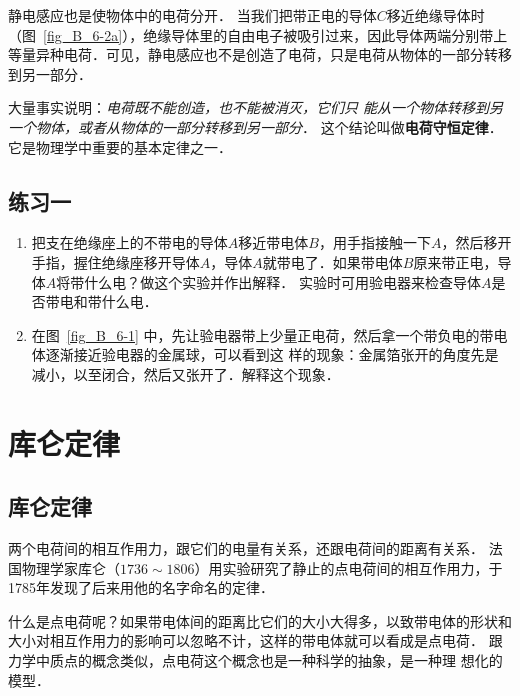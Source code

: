 静电感应也是使物体中的电荷分开．
当我们把带正电的导体$C$移近绝缘导体时（图~\ref{fig_B_6-2a}），绝缘导体里的自由电子被吸引过来，因此导体两端分别带上等量异种电荷．可见，静电感应也不是创造了电荷，只是电荷从物体的一部分转移到另一部分．


大量事实说明：\textit{电荷既不能创造，也不能被消灭，它们只
能从一个物体转移到另一个物体，或者从物体的一部分转移到另一部分}．
这个结论叫做\textbf{电荷守恒定律}．它是物理学中重要的基本定律之一．

\subsection*{练习一}
\begin{enumerate}
\item 把支在绝缘座上的不带电的导体$A$移近带电体$B$，用手指接触一下$A$，然后移开手指，握住绝缘座移开导体$A$，导体$A$就带电了．如果带电体$B$原来带正电，导体$A$将带什么电？做这个实验并作出解释．
实验时可用验电器来检查导体$A$是否带电和带什么电．
\item 在图~\ref{fig_B_6-1} 中，先让验电器带上少量正电荷，然后拿一个带负电的带电体逐渐接近验电器的金属球，可以看到这
样的现象：金属箔张开的角度先是减小，以至闭合，然后又张开了．解释这个现象．
\end{enumerate}


\section{库仑定律}
\subsection{库仑定律} 

两个电荷间的相互作用力，跟它们的电量有关系，还跟电荷间的距离有关系．
法国物理学家库仑（$1736 \sim 1806$）用实验研究了静止的点电荷间的相互作用力，于1785年发现了后来用他的名字命名的定律．

什么是点电荷呢？如果带电体间的距离比它们的大小大得多，以致带电体的形状和大小对相互作用力的影响可以忽略不计，这样的带电体就可以看成是点电荷．
跟力学中质点的概念类似，点电荷这个概念也是一种科学的抽象，是一种理
想化的模型．

